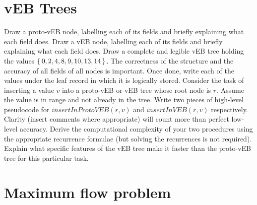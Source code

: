 \documentclass[10pt,a4paper]{exam}
\begin{document}
\begin{questions}

\section{vEB Trees}

\question[2] Draw a proto-vEB node, labelling each of its fields and briefly explaining what each field does. \droppoints
\question[2] Draw a vEB node, labelling each of its fields and briefly explaining what each field does. \droppoints 
\question[6] Draw a complete and legible vEB tree holding the values $\{\,0,2,4,8,9,10,13,14\,\}$. The correctness of the structure and the accuracy of all fields of all nodes is important. Once done, write each of the values under the leaf record in which it is logically stored. \droppoints 
\question[10] Consider the task of inserting a value $v$ into a proto-vEB or vEB tree whose root node is $r$. Assume the value is in range and not already in the tree. Write two pieces of high-level pseudocode for $\mathit{insertInProtoVEB}(r,v)$ and $\mathit{insertInVEB}(r,v)$ respectively. Clarity (insert comments where appropriate) will count more than perfect low-level accuracy. Derive the computational complexity of your two procedures using the appropriate recurrence formulae (but solving the recurrences is not required). Explain what specific features of the vEB tree make it faster than the proto-vEB tree for this particular task. \droppoints  

\section{Maximum flow problem}


\end{questions}
\end{document}
